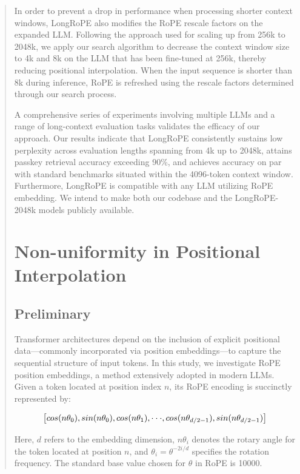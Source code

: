 \begin{abstract}
In order to prevent a drop in performance when processing shorter context windows, {LongRoPE} also modifies the RoPE rescale factors on the expanded LLM. Following the approach used for scaling up from 256k to 2048k, we apply our search algorithm to decrease the context window size to 4k and 8k on the LLM that has been fine-tuned at 256k, thereby reducing positional interpolation. When the input sequence is shorter than 8k during inference, RoPE is refreshed using the rescale factors determined through our search process.

A comprehensive series of experiments involving multiple LLMs and a range of long-context evaluation tasks validates the efficacy of our approach. Our results indicate that LongRoPE consistently sustains low perplexity across evaluation lengths spanning from 4k up to 2048k, attains passkey retrieval accuracy exceeding 90\%, and achieves accuracy on par with standard benchmarks situated within the 4096-token context window. Furthermore, LongRoPE is compatible with any LLM utilizing RoPE embedding. We intend to make both our codebase and the LongRoPE-2048k models publicly available.

\section{Non-uniformity in Positional Interpolation}
\label{sec:analysis}

\subsection{Preliminary}

Transformer architectures depend on the inclusion of explicit positional data—commonly incorporated via position embeddings—to capture the sequential structure of input tokens. In this study, we investigate RoPE~\cite{rope} position embeddings, a method extensively adopted in modern LLMs. Given a token located at position index $n$, its RoPE encoding is succinctly represented by:

\begin{equation}
		\fontsize{7.8}{7.8} \selectfont
	\label{eq:rope}
	\left[ cos(n\theta_0), sin(n\theta_0), cos(n\theta_1), \cdot\cdot\cdot, cos(n\theta_{d/2-1}), sin(n\theta_{d/2-1}) \right]   
\end{equation}

Here, $d$ refers to the embedding dimension, $n\theta_i$ denotes the rotary angle for the token located at position $n$, and $\theta_i=\theta^{-2i/d}$ specifies the rotation frequency. The standard base value chosen for $\theta$ in RoPE is 10000.


\end{abstract}
